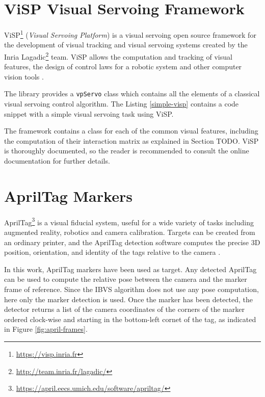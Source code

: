 \section{ViSP Visual Servoing Framework}
\label{sec:visp}

ViSP\footnote{\url{https://visp.inria.fr}} (\emph{Visual Servoing Platform}) is a visual servoing open source framework for the development of visual tracking and visual servoing systems created by the Inria Lagadic\footnote{\url{http://team.inria.fr/lagadic/}} team. ViSP allows the computation and tracking of visual features, the design of control laws for a robotic system and other computer vision tools \cite{visp_hp}.


The library provides a \texttt{vpServo} class which contains all the elements of a classical visual servoing control algorithm. The Listing \ref{simple-visp} contains a code snippet with a simple visual servoing task using ViSP.


The framework contains a class for each of the common visual features, including the computation of their interaction matrix as explained in Section TODO. ViSP is thoroughly documented, so the reader is recommended to consult the online documentation\cite{visp_doc} for further details.

\section{AprilTag Markers}
\label{sec:apriltag_markers}

AprilTag\footnote{\url{https://april.eecs.umich.edu/software/apriltag/}} is a visual fiducial system, useful for a wide variety of tasks including augmented reality, robotics and camera calibration. Targets can be created from an ordinary printer, and the AprilTag detection software computes the precise 3D position, orientation, and identity of the tags relative to the camera \cite{apriltag_hp}. 

In this work, AprilTag markers have been used as target. Any detected AprilTag can be used to compute the relative pose between the camera and the marker frame of reference. Since the IBVS algorithm does not use any pose computation, here only the marker detection is used. Once the marker has been detected, the detector returns a list of the camera coordinates of the corners of the marker ordered clock-wise and starting in the bottom-left cornet of the tag, as indicated in Figure \ref{fig:april-frames}.

